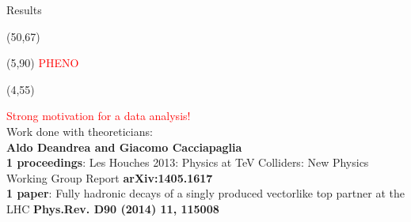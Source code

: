 \begin{frame}{Results}
\begin{textblock}{75}(50,67)
\end{textblock}

\begin{textblock}{50}(5,90)
\textcolor{red}{PHENO}
\end{textblock}

\begin{textblock}{43}(4,55)
\begin{alertblock}{}\tiny
\textcolor{red}{Strong motivation for a data analysis!}\\
Work done with theoreticians: \\\textbf{Aldo Deandrea and Giacomo Cacciapaglia}\\
\textbf{1 proceedings}: Les Houches 2013: Physics at TeV Colliders: New Physics Working Group Report \textbf{arXiv:1405.1617} \\
\textbf{1 paper}: Fully hadronic decays of a singly produced vectorlike top partner at the LHC \textbf{Phys.Rev. D90 (2014) 11, 115008}
\end{alertblock}
\end{textblock}

\end{frame}


